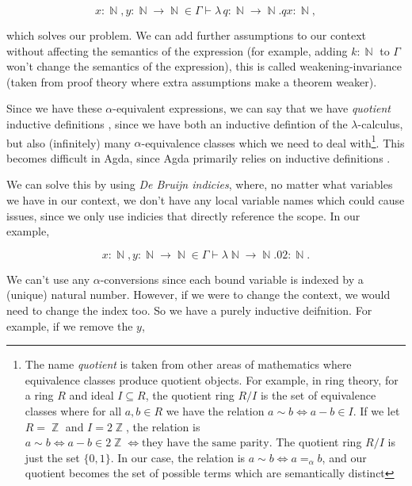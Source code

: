 \documentclass[logo,bsc,singlespacing,parskip,online]{infthesis}
\DeclareMathOperator{\nat}{\mathbb{N}}
\DeclareMathOperator{\integer}{\mathbb{Z}}
\begin{document}
\begin{equation*}
  x \colon \nat, y \colon \nat \to \nat \in \Gamma \vdash \lambda \, q \colon \nat \to \nat. q x \colon \nat,
\end{equation*}

which solves our problem. We can add further assumptions to our context without
affecting the semantics of the expression (for example, adding $k \colon \nat$
to $\Gamma$ won't change the semantics of the expression), this is called
weakening-invariance (taken from proof theory where extra assumptions make a
theorem weaker).

Since we have these $\alpha$-equivalent expressions, we can say that we have
\textit{quotient} inductive definitions \citep{aydemir_engineering_2008}, since
we have both an inductive defintion of the $\lambda$-calculus, but also
(infinitely) many $\alpha$-equivalence classes which we need to deal
with\footnote{The name \textit{quotient} is taken from other areas of
mathematics where equivalence classes produce quotient objects. For example, in
ring theory, for a ring $R$ and ideal $I \subseteq R$, the quotient ring $R/I$
is the set of equivalence classes where for all $a, b \in R$ we have the
relation $a \sim b \iff a - b \in I$. If we let $R = \integer$ and $I =
2\integer$, the relation is $a \sim b \iff a - b \in 2\integer \iff \text{they have
the same parity}$. The quotient ring $R/I$ is just the set $\{0, 1\}$. In our
case, the relation is $a \sim b \iff a =_{\alpha} b$, and our quotient becomes the
set of possible terms which are semantically distinct}. This becomes difficult
in Agda, since Agda primarily relies on inductive definitions
\citep{pitts_locally_2023}.

We can solve this by using \textit{De Bruijn indicies}, where, no matter what
variables we have in our context, we don't have any local variable names which
could cause issues, since we only use indicies that directly reference the
scope. In our example,

\begin{equation*}
  x \colon \nat, y \colon \nat \to \nat \in \Gamma \vdash \lambda \nat \to \nat. 0 2 \colon \nat.
\end{equation*}

We can't use any $\alpha$-conversions since each bound variable is indexed by a
(unique) natural number. However, if we were to change the context, we would
need to change the index too. So we have a purely inductive deifnition. For
example, if we remove the $y$,
\end{document}
